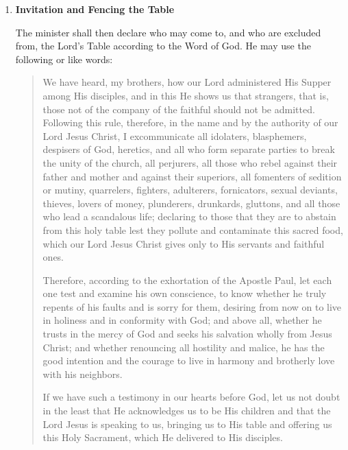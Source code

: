 \documentclass[
]{book}
\begin{document}
\begin{enumerate}
\def\labelenumi{\arabic{enumi}.}
\setcounter{enumi}{3}
\item
  \textbf{Invitation and Fencing the Table}

  The minister shall then declare who may come to, and who are excluded from, the Lord's Table according to the Word of God. He may use the following or like words:

  \begin{quote}
  We have heard, my brothers, how our Lord administered His Supper among His disciples, and in this He shows us that strangers, that is, those not of the company of the faithful should not be admitted. Following this rule, therefore, in the name and by the authority of our Lord Jesus Christ, I excommunicate all idolaters, blasphemers, despisers of God, heretics, and all who form separate parties to break the unity of the church, all perjurers, all those who rebel against their father and mother and against their superiors, all fomenters of sedition or mutiny, quarrelers, fighters, adulterers, fornicators, sexual deviants, thieves, lovers of money, plunderers, drunkards, gluttons, and all those who lead a scandalous life; declaring to those that they are to abstain from this holy table lest they pollute and contaminate this sacred food, which our Lord Jesus Christ gives only to His servants and faithful ones.

  Therefore, according to the exhortation of the Apostle Paul, let each one test and examine his own conscience, to know whether he truly repents of his faults and is sorry for them, desiring from now on to live in holiness and in conformity with God; and above all, whether he trusts in the mercy of God and seeks his salvation wholly from Jesus Christ; and whether renouncing all hostility and malice, he has the good intention and the courage to live in harmony and brotherly love with his neighbors.

  If we have such a testimony in our hearts before God, let us not doubt in the least that He acknowledges us to be His children and that the Lord Jesus is speaking to us, bringing us to His table and offering us this Holy Sacrament, which He delivered to His disciples.


\end{quote}
\end{enumerate}
\end{document}

